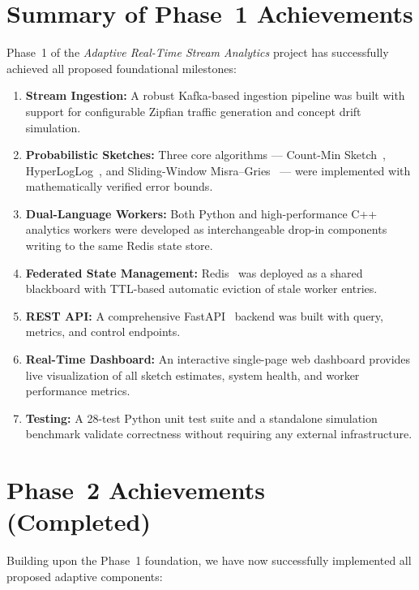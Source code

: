 \section{Summary of Phase~1 Achievements}

Phase~1 of the \textit{Adaptive Real-Time Stream Analytics} project has successfully achieved all proposed foundational milestones:

\begin{enumerate}
    \item \textbf{Stream Ingestion:} A robust Kafka-based ingestion pipeline was built with support for configurable Zipfian traffic generation and concept drift simulation.
    \item \textbf{Probabilistic Sketches:} Three core algorithms --- Count-Min Sketch~\cite{cms}, HyperLogLog~\cite{hll}, and Sliding-Window Misra--Gries~\cite{misra} --- were implemented with mathematically verified error bounds.
    \item \textbf{Dual-Language Workers:} Both Python and high-performance C++ analytics workers were developed as interchangeable drop-in components writing to the same Redis state store.
    \item \textbf{Federated State Management:} Redis~\cite{redis} was deployed as a shared blackboard with TTL-based automatic eviction of stale worker entries.
    \item \textbf{REST API:} A comprehensive FastAPI~\cite{fastapi} backend was built with query, metrics, and control endpoints.
    \item \textbf{Real-Time Dashboard:} An interactive single-page web dashboard provides live visualization of all sketch estimates, system health, and worker performance metrics.
    \item \textbf{Testing:} A 28-test Python unit test suite and a standalone simulation benchmark validate correctness without requiring any external infrastructure.
\end{enumerate}

\section{Phase~2 Achievements (Completed)}

Building upon the Phase~1 foundation, we have now successfully implemented all proposed adaptive components:

